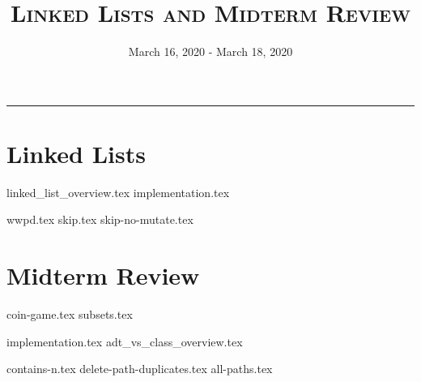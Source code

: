 \documentclass{exam}
\title{\textsc{Linked Lists and Midterm Review}}
\date{March 16, 2020 - March 18, 2020}
\begin{document}
\maketitle
\rule{\textwidth}{0.15em}
\fontsize{12}{15}\selectfont

\section{Linked Lists}
{linked_list_overview.tex}
{implementation.tex}
\newpage
\begin{questions}
{wwpd.tex}
\newpage
{skip.tex}
{skip-no-mutate.tex}
\end{questions}


\section{Midterm Review}
\begin{questions}
{coin-game.tex}
{subsets.tex}
\end{questions}
\newpage
{implementation.tex}
{adt_vs_class_overview.tex}
\vspace{\baselineskip}
\begin{questions}
{contains-n.tex}
{delete-path-duplicates.tex}
\newpage
{all-paths.tex}

\end{questions}
\end{document}
